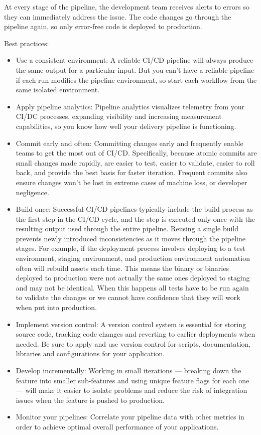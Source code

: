 \documentclass[12pt]{book}
\begin{document}
\begin{itemize}
At every stage of the pipeline, the development team receives alerts to errors so they can immediately address the issue. The code changes go through the pipeline again, so only error-free code is deployed to production.
\end{itemize}

Best practices:
\begin{itemize}
    \item Use a consistent environment: A reliable CI/CD pipeline will always produce the same output for a particular input. But you can't have a reliable pipeline if each run modifies the pipeline environment, so start each workflow from the same isolated environment.
    \item Apply pipeline analytics: Pipeline analytics visualizes telemetry from your CI/DC processes, expanding visibility and increasing measurement capabilities, so you know how well your delivery pipeline is functioning. 
    \item Commit early and often: Committing changes early and frequently enable teams to get the most out of CI/CD. Specifically, because atomic commits are small changes made rapidly, are easier to test, easier to validate, easier to roll back, and provide the best basis for faster iteration. Frequent commits also ensure changes won't be lost in extreme cases of machine loss, or developer negligence.
    \item Build once: Successful CI/CD pipelines typically include the build process as the first step in the CI/CD cycle, and the step is executed only once with the resulting output used through the entire pipeline. Reusing a single build prevents newly introduced  inconsistencies as it moves through the pipeline stages. 
    For example, if the deployment process involves deploying to a test environment, staging environment, and production environment automation often will rebuild assets each time. This means the binary or binaries deployed to production were not actually the same ones deployed to staging and may not be identical. When this happens all tests have to be run again to validate the changes or we cannot have confidence that they will work when put into production. 
    \item Implement version control: A version control system is essential for storing source code, tracking code changes and reverting to earlier deployments when needed. Be sure to apply and use version control for scripts, documentation, libraries and configurations for your application. 
    \item Develop incrementally: Working in small iterations — breaking down the feature into smaller sub-features and using unique feature flags for each one — will make it easier to isolate problems and reduce the risk of integration issues when the feature is pushed to production.
    \item Monitor your pipelines: Correlate your pipeline data with other metrics in order to achieve optimal overall performance of your applications.
\end{itemize}
\end{document}
